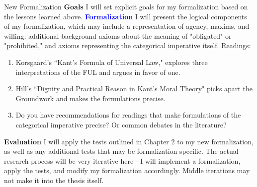 \documentclass[11pt]{article}
\begin{document}
\begin{outline}[enumerate]
\1[Chapter 3:] New Formalization
\2 \textbf{Goals} I will set explicit goals for my formalization based on the lessons learned above.
\2 \textcolor{blue}{\textbf{Formalization}} I will present the logical components of my formalization, which may include a representation of agency, maxims, and willing; additional background axioms about the meaning of "obligated" or "prohibited," and axioms representing the categorical imperative itself. Readings:
\begin{enumerate}
    \item Korsgaard's ``Kant's Formula of Universal Law," \cite{KorsgaardFUL} explores three interpretations of the FUL and argues in favor of one.
    \item Hill's ``Dignity and Practical Reason in Kant’s Moral Theory" \cite{hill_2019} picks apart the Groundwork and makes the formulations precise.
    \item Do you have recommendations for readings that make formulations of the categorical imperative precise? Or common debates in the literature?
\end{enumerate}
\2 \textbf{Evaluation} I will apply the tests outlined in Chapter 2 to my new formalization, as well as any additional tests that may be formalization specific. The actual research process will be very iterative here - I will implement a formalization, apply the tests, and modify my formalization accordingly. Middle iterations may not make it into the thesis itself.


\end{outline}
\end{document}
